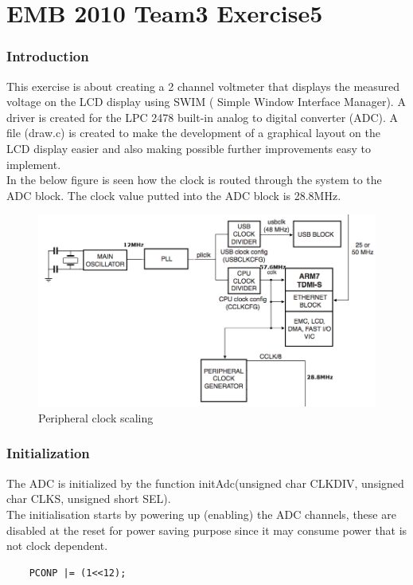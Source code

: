 
\usepackage{doxygen}

\part*{EMB 2010 Team3 Exercise5}
\section{Introduction}
This exercise is about creating a 2 channel voltmeter that displays the measured voltage on the LCD display using SWIM ( Simple Window Interface Manager).
A driver is created for the LPC 2478 built-in analog to digital converter (ADC).
A file (draw.c) is created to make the development of a graphical layout on the LCD display easier and also making possible further improvements easy to implement. 
\\ \newline
In the below figure is seen how the clock is routed through the system to the ADC block. The clock value putted into the ADC block is 28.8MHz.
\\ \newline
\begin{figure}[h!]
   \centering
   \includegraphics[width=1\textwidth]{peripheral_clock_gen.png}
   \caption{Peripheral clock scaling}
   \label{fig:example}
\end{figure}

\newpage
\section{Initialization}

The ADC is initialized by the function initAdc(unsigned char CLKDIV, unsigned char CLKS, unsigned short SEL).
\\ \newline
The initialisation starts by powering up (enabling) the ADC channels, these are disabled at the reset for power saving purpose since it may consume power that is not clock dependent.
\begin{lstlisting} 
	PCONP |= (1<<12);
 \end{lstlisting}

